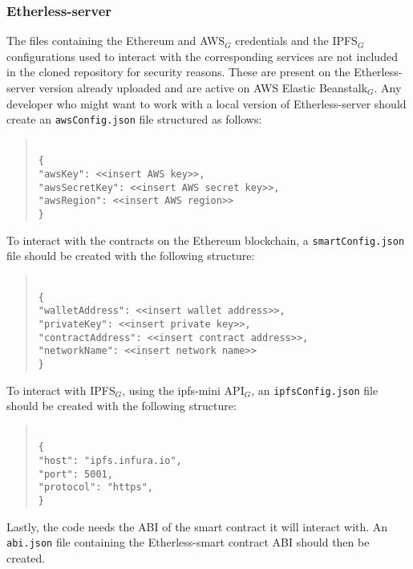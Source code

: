 \subsubsection{Etherless-server}
The files containing the Ethereum and AWS$_{G}$ credentials and the IPFS$_{G}$ configurations used to interact with the corresponding services are not included in the cloned repository for security reasons. These are present on the Etherless-server version already uploaded and are active on AWS Elastic Beanstalk$_{G}$.
Any developer who might want to work with a local version of Etherless-server should create an \texttt{awsConfig.json} file structured as follows:
\begin{quote}
	\texttt{ \\
		\{\\
		"awsKey": <<insert AWS key>>, \\
		"awsSecretKey": <<insert AWS secret key>>, \\
		"awsRegion": <<insert AWS region>> \\
		\}\\
	}
\end{quote}
To interact with the contracts on the Ethereum blockchain, a \texttt{smartConfig.json} file should be created with the following structure:
\begin{quote}
	\texttt{ \\
		\{\\
		"walletAddress": <<insert wallet address>>, \\
		"privateKey": <<insert private key>>, \\
		"contractAddress": <<insert contract address>>, \\
		"networkName": <<insert network name>> \\
		\}\\
	}
\end{quote}
To interact with IPFS$_{G}$, using the ipfs-mini API$_{G}$, an \texttt{ipfsConfig.json} file should be created with the following structure:
\begin{quote}
	\texttt{ \\
		\{\\
		"host": "ipfs.infura.io", \\
		"port": 5001, \\
		"protocol": "https", \\
		\}\\
	}
\end{quote}
Lastly, the code needs the ABI of the smart contract it will interact with. An \texttt{abi.json} file containing the Etherless-smart contract ABI should then be created.
